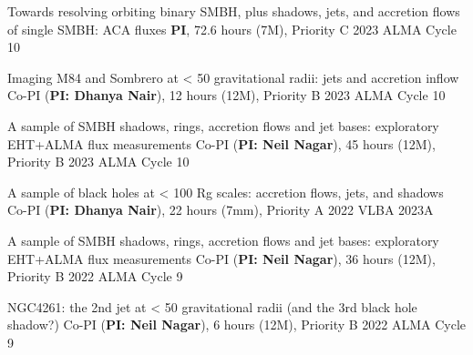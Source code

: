 
\begin{cvpublications}{}

	 {Towards resolving orbiting binary SMBH, plus shadows, jets, and accretion flows of single SMBH: ACA fluxes}
	 {\textbf{PI}, 72.6 hours (7M), Priority C}
	 {2023}
     {ALMA Cycle 10}
     {}

	 {Imaging M84 and Sombrero at < 50 gravitational radii: jets and accretion inflow}
	 {Co-PI (\textbf{PI: Dhanya Nair}), 12 hours (12M), Priority B}
	 {2023}
     {ALMA Cycle 10}
     {}

	 {A sample of SMBH shadows, rings, accretion flows and jet bases: exploratory EHT+ALMA flux measurements}
	 {Co-PI (\textbf{PI: Neil Nagar}), 45 hours (12M), Priority B}
	 {2023}
     {ALMA Cycle 10}
     {}

	 {A sample of black holes at < 100 Rg scales: accretion flows, jets, and shadows}
	 {Co-PI (\textbf{PI: Dhanya Nair}), 22 hours (7mm), Priority A}
	 {2022}
     {VLBA 2023A}
     {}

	 {A sample of SMBH shadows, rings, accretion flows and jet bases: exploratory EHT+ALMA flux measurements}
	 {Co-PI (\textbf{PI: Neil Nagar}), 36 hours (12M), Priority B}
	 {2022}
     {ALMA Cycle 9}
     {}

	 {NGC4261: the 2nd jet at < 50 gravitational radii (and the 3rd black hole shadow?)}
	 {Co-PI (\textbf{PI: Neil Nagar}), 6 hours (12M), Priority B}
	 {2022}
     {ALMA Cycle 9}
     {}

\end{cvpublications}
